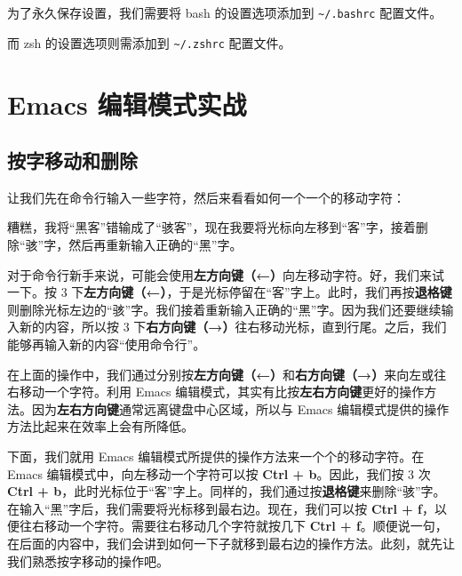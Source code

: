 \documentclass[]{ctexbook}
\newenvironment{Shaded}{\begin{snugshade}}{\end{snugshade}}
\newcommand{\ExtensionTok}[1]{#1}
\newcommand{\NormalTok}[1]{#1}
\begin{document}
为了永久保存设置，我们需要将 bash 的设置选项添加到 \texttt{\textasciitilde{}/.bashrc} 配置文件。

而 zsh 的设置选项则需添加到 \texttt{\textasciitilde{}/.zshrc} 配置文件。

\hypertarget{emacs-ux7f16ux8f91ux6a21ux5f0fux5b9eux6218}{%
\section{Emacs 编辑模式实战}\label{emacs-ux7f16ux8f91ux6a21ux5f0fux5b9eux6218}}

\hypertarget{ux6309ux5b57ux79fbux52a8ux548cux5220ux9664}{%
\subsection{按字移动和删除}\label{ux6309ux5b57ux79fbux52a8ux548cux5220ux9664}}

让我们先在命令行输入一些字符，然后来看看如何一个一个的移动字符：

\begin{Shaded}
\end{Shaded}

糟糕，我将``黑客''错输成了``骇客''，现在我要将光标向左移到``客''字，接着删除``骇''字，然后再重新输入正确的``黑''字。

对于命令行新手来说，可能会使用\textbf{左方向键（←）}向左移动字符。好，我们来试一下。按 3 下\textbf{左方向键（←）}，于是光标停留在``客''字上。此时，我们再按\textbf{退格键}则删除光标左边的``骇''字。我们接着重新输入正确的``黑''字。因为我们还要继续输入新的内容，所以按 3 下\textbf{右方向键（→）}往右移动光标，直到行尾。之后，我们能够再输入新的内容``使用命令行''。

在上面的操作中，我们通过分别按\textbf{左方向键（←）}和\textbf{右方向键（→）}来向左或往右移动一个字符。利用 Emacs 编辑模式，其实有比按\textbf{左右方向键}更好的操作方法。因为\textbf{左右方向键}通常远离键盘中心区域，所以与 Emacs 编辑模式提供的操作方法比起来在效率上会有所降低。

下面，我们就用 Emacs 编辑模式所提供的操作方法来一个个的移动字符。在 Emacs 编辑模式中，向左移动一个字符可以按 \textbf{Ctrl + b}。因此，我们按 3 次 \textbf{Ctrl + b}，此时光标位于``客''字上。同样的，我们通过按\textbf{退格键}来删除``骇''字。在输入``黑''字后，我们需要将光标移到最右边。现在，我们可以按 \textbf{Ctrl + f}，以便往右移动一个字符。需要往右移动几个字符就按几下 \textbf{Ctrl + f}。顺便说一句，在后面的内容中，我们会讲到如何一下子就移到最右边的操作方法。此刻，就先让我们熟悉按字移动的操作吧。
\end{document}
